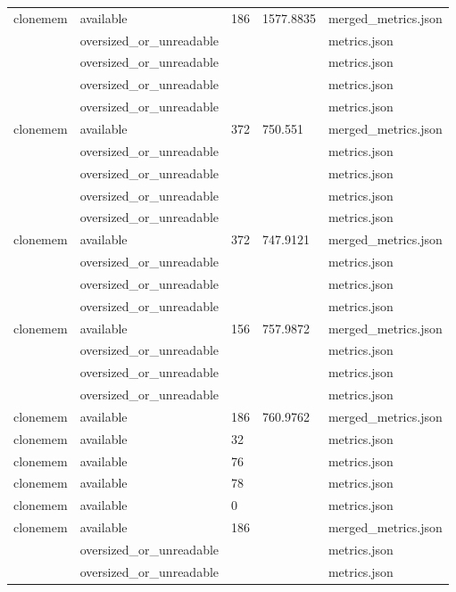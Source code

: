 \begin{tabular}{lllll}
clonemem & available & 186 & 1577.8835 & merged_metrics.json \\
 & oversized_or_unreadable &  &  & metrics.json \\
 & oversized_or_unreadable &  &  & metrics.json \\
 & oversized_or_unreadable &  &  & metrics.json \\
 & oversized_or_unreadable &  &  & metrics.json \\
clonemem & available & 372 & 750.551 & merged_metrics.json \\
 & oversized_or_unreadable &  &  & metrics.json \\
 & oversized_or_unreadable &  &  & metrics.json \\
 & oversized_or_unreadable &  &  & metrics.json \\
 & oversized_or_unreadable &  &  & metrics.json \\
clonemem & available & 372 & 747.9121 & merged_metrics.json \\
 & oversized_or_unreadable &  &  & metrics.json \\
 & oversized_or_unreadable &  &  & metrics.json \\
 & oversized_or_unreadable &  &  & metrics.json \\
clonemem & available & 156 & 757.9872 & merged_metrics.json \\
 & oversized_or_unreadable &  &  & metrics.json \\
 & oversized_or_unreadable &  &  & metrics.json \\
 & oversized_or_unreadable &  &  & metrics.json \\
clonemem & available & 186 & 760.9762 & merged_metrics.json \\
clonemem & available & 32 &  & metrics.json \\
clonemem & available & 76 &  & metrics.json \\
clonemem & available & 78 &  & metrics.json \\
clonemem & available & 0 &  & metrics.json \\
clonemem & available & 186 &  & merged_metrics.json \\
 & oversized_or_unreadable &  &  & metrics.json \\
 & oversized_or_unreadable &  &  & metrics.json \\
\bottomrule
\end{tabular}
